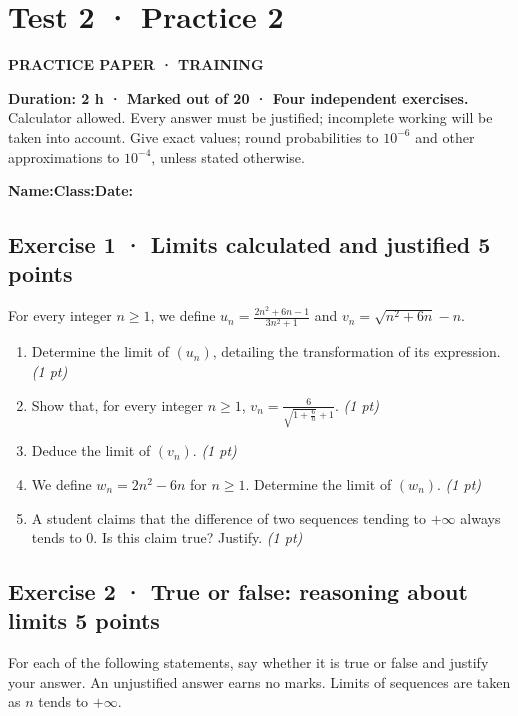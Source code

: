 \fi

\clearpage{}\label{sujet:2-2}

\section*{Test 2 · Practice 2}

{\sffamily\bfseries\color{teal}PRACTICE PAPER · TRAINING\par}

\textbf{Duration: 2 h · Marked out of 20 · Four independent exercises.}\\Calculator allowed. Every answer must be justified; incomplete working will be taken into account. Give exact values; round probabilities to $10^{-6}$ and other approximations to $10^{-4}$, unless stated otherwise.

\smallskip\textbf{Name:}\enspace\dotfill\quad\textbf{Class:}\enspace\dotfill\quad\textbf{Date:}\enspace\dotfill

\subsection*{Exercise 1 · Limits calculated and justified \hfill 5 points}For every integer $n\ge1$, we define $u_n=\frac{2n^2+6n-1}{3n^2+1}$ and $v_n=\sqrt{n^2+6n}-n$.

\begin{enumerate}

\item Determine the limit of $(u_n)$, detailing the transformation of its expression. \hfill\textit{(1 pt)}

\item Show that, for every integer $n\ge1$, $v_n=\frac{6}{\sqrt{1+\frac{6}n}+1}$. \hfill\textit{(1 pt)}

\item Deduce the limit of $(v_n)$. \hfill\textit{(1 pt)}

\item We define $w_n=2n^2-6n$ for $n\ge1$. Determine the limit of $(w_n)$. \hfill\textit{(1 pt)}

\item A student claims that the difference of two sequences tending to $+\infty$ always tends to $0$. Is this claim true? Justify. \hfill\textit{(1 pt)}

\end{enumerate}

\subsection*{Exercise 2 · True or false: reasoning about limits \hfill 5 points}For each of the following statements, say whether it is true or false and justify your answer. An unjustified answer earns no marks. Limits of sequences are taken as $n$ tends to $+\infty$.

